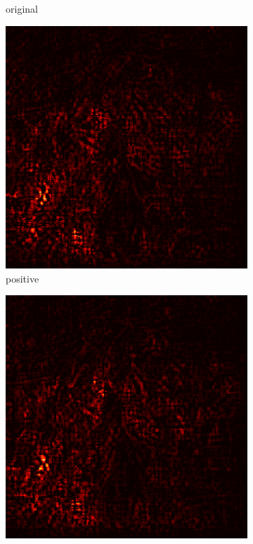 \documentclass[preprint,12pt]{elsarticle}
\begin{document}
\begin{figure}
\begin{subfigure}{0.14\linewidth}
        \caption{original}
    \end{subfigure}
    \hfill
    \begin{subfigure}{0.14\textwidth}
        \centering
        \includegraphics[width=\linewidth]{../visualizations/examples/imagenette/resnet18/positive_saliency_map/4.png}
        \caption{positive}
    \end{subfigure}
    \hfill
    \begin{subfigure}{0.14\textwidth}
        \centering
        \includegraphics[width=\linewidth]{../visualizations/examples/imagenette/resnet18/negative_saliency_map/4.png}

\end{subfigure}
\end{figure}
\end{document}
